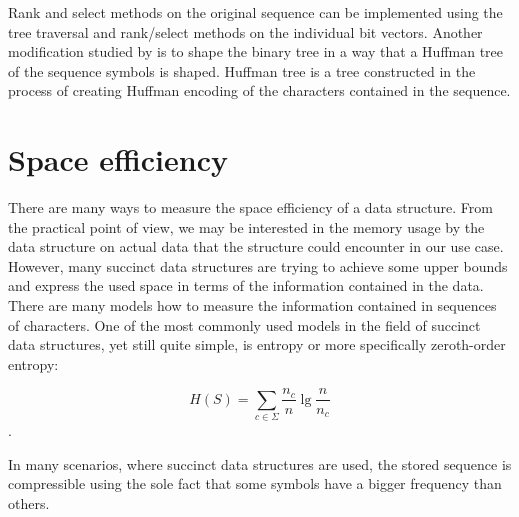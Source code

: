 Rank and select methods on the original sequence can be implemented using the tree
traversal and rank/select methods on the individual bit vectors. Another modification
studied by \cite{makinen2005succinct} is to shape the binary tree in a way that a Huffman
tree of the sequence symbols is shaped. Huffman tree is a tree constructed in the
process of creating Huffman encoding of the characters contained in the sequence.

\section{Space efficiency}

There are many ways to measure the space efficiency of a data structure. From the
practical point of view, we may be interested in the memory usage by the data
structure on actual data that the structure could encounter in our use case. However,
many succinct data structures are trying to achieve some upper bounds and express
the used space in terms of the information contained in the data. There are many
models how to measure the information contained in sequences of characters. One
of the most commonly used models in the field of succinct data structures, yet still
quite simple, is entropy or more specifically zeroth-order entropy:

$$H(S)=\sum_{c\in\Sigma} \frac{n_c}{n} \lg \frac{n}{n_c}$$.

In many scenarios, where succinct data structures are used, the stored sequence
is compressible using the sole fact that some symbols have a bigger frequency than others.